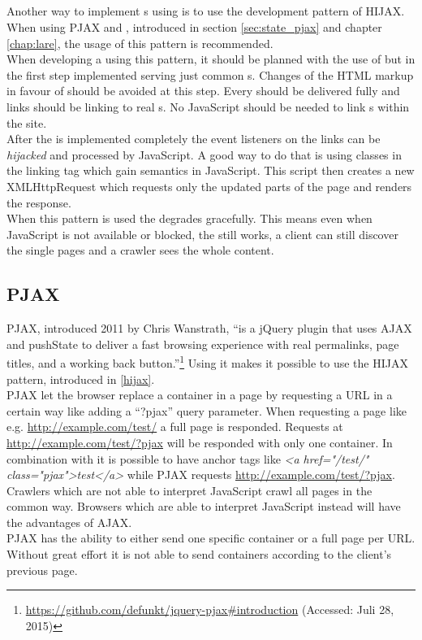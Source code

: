 \subsection{\hijax{}\label{hijax}}
Another way to implement \singlePageApplication{}s using \ajax{} is to use the development pattern of HIJAX.
When using PJAX and \lare{}, introduced in section \ref{sec:state_pjax} and chapter \ref{chap:lare}, the usage of this pattern is recommended.
\\
When developing a \webSite{} using this pattern, it should be planned with the use of \ajax{} but in the first step implemented serving just common \httpRequest{}s.
Changes of the HTML markup in favour of \ajax{} should be avoided at this step.
Every \webPage{} should be delivered fully and links should be linking to real \webPage{}s.
No JavaScript should be needed to link \webPage{}s within the site.
\\
After the \webSite{} is implemented completely the event listeners on the links can be \emph{hijacked} and processed by JavaScript.
A good way to do that is using classes in the linking tag which gain semantics in JavaScript.
This script then creates a new XMLHttpRequest which requests only the updated parts of the page and renders the response.
\\
When this pattern is used the \webSite{} degrades gracefully.
This means even when JavaScript is not available or blocked, the \webSite{} still works, a client can still discover the single pages and a crawler sees the whole content.

\subsection{PJAX\label{sec:state_pjax}}
PJAX, introduced 2011 by Chris Wanstrath, \enquote{is a jQuery plugin that uses AJAX and pushState to deliver a fast browsing experience with real permalinks, page titles, and a working back button.}\footnote{\url{https://github.com/defunkt/jquery-pjax\#introduction} (Accessed: Juli 28, 2015)}
Using it makes it possible to use the HIJAX pattern, introduced in \ref{hijax}.
\\
PJAX let the browser replace a container in a page by requesting a URL in a certain way like adding a \enquote{?pjax} query parameter.
When requesting a page like e.g. \url{http://example.com/test/} a full page is responded.
Requests at \url{http://example.com/test/?pjax} will be responded with only one container.
In combination with \hijax{} it is possible to have anchor tags like \emph{<a href="/test/" class="pjax">\newline{}test</a>} while PJAX requests \url{http://example.com/test/?pjax}.
\\
Crawlers which are not able to interpret JavaScript crawl all pages in the common way.
Browsers which are able to interpret JavaScript instead will have the advantages of AJAX.
\\
PJAX has the ability to either send one specific container or a full page per URL. 
Without great effort it is not able to send containers according to the client's previous page.
